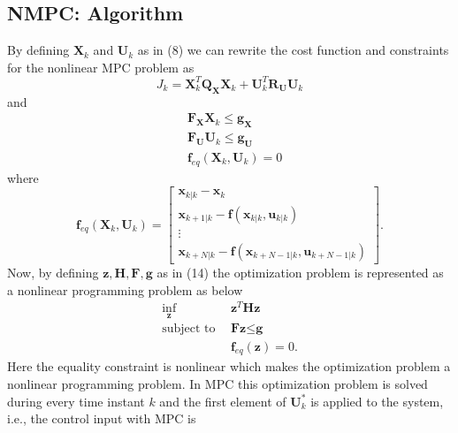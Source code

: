 \documentclass{article}
\begin{document}
\subsection{NMPC: Algorithm}
\par By defining  $\textbf{X}_{k}$ and 
$\textbf{U}_{k}$ as in (8) we can rewrite the cost function and constraints for the nonlinear MPC problem as 
\begin{equation}
    J_{k}=  \textbf{X}_{k}^{T}\textbf{Q}_{\textbf{X}} \textbf{X}_{k}+\textbf{U}_{k}^{T}\textbf{R}_{\textbf{U}} \textbf{U}_{k}
\end{equation}
and
\begin{equation}
\begin{aligned}
  & \textbf{F}_{\textbf{X}}\textbf{X}_{k} \leq \textbf{g}_{\textbf{X}}\\
   & \textbf{F}_{\textbf{U}}\textbf{U}_{k} \leq \textbf{g}_{\textbf{U}}\\ 
&\textbf{f}_{eq}(\textbf{X}_{k},\textbf{U}_{k})=0
    \end{aligned}
\end{equation}
where 
\begin{equation}
    \textbf{f}_{eq}(\textbf{X}_{k},\textbf{U}_{k})= \left[\begin{matrix}  \textbf{x}_{k|k}-\textbf{x}_{k}\\\textbf{x}_{k+1|k}-\textbf{f}(\textbf{x}_{k|k},\textbf{u}_{k|k})\\ \vdots \\
    \textbf{x}_{k+N|k}-\textbf{f}(\textbf{x}_{k+{N}-1|k},\textbf{u}_{k+{N}-1|k})
\end{matrix}\right].
\end{equation}
Now, by defining $\textbf{z},\textbf{H},\textbf{F},\textbf{g}$ as in (14) the optimization problem is represented as a nonlinear programming problem as below
\begin{equation}
\begin{aligned}
 \underset{\textbf{z}}{\text{inf}} ~&~     \textbf{z}^{T}\textbf{H}\textbf{z}\\
 \text{subject to}
~&~ \textbf{F}\textbf{z} \leq \textbf{g}\\
  ~&~ \textbf{f}_{eq}(\textbf{z}) = 0.
     \end{aligned}
\end{equation}
Here the equality constraint is nonlinear which makes the optimization problem a nonlinear programming problem.
In MPC this optimization problem is solved during every time instant $k$ and the first element of $\textbf{U}_{k}^{*}$ is applied to the system, i.e., the control input with MPC  is 
\end{document}
